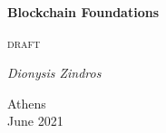\makeatletter
\def\@primarycover[#1][#2]{
 \begin{titlepage}
  \centering
  {\huge\bfseries Blockchain Foundations\par}
  \vspace{2cm}
  {\Large \color{red} \textsc{draft}\par}
  \vspace{2cm}
  {\Large\itshape Dionysis
                  Zindros\par}
  \vfill
  {\large Athens\\
          \vspace{1cm}
          #1\\
          #2\par
          }
 \end{titlepage}
}
\@primarycover[June 2021][]
\makeatother
\thispagestyle{empty}\newpage
